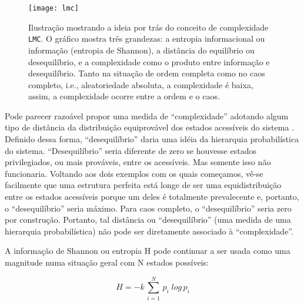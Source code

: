 \documentclass[
	12pt,				%
	openany,oneside,
	a4paper,			%
	english,			%
	brazil,				%
	]{abntex2}
\begin{document}
\begin{figure}
\texttt{[image: lmc]}
\caption{\label{fig2}Ilustração mostrando a ideia por trás do conceito de complexidade \texttt{LMC}. O gráfico mostra três grandezas: a entropia informacional ou informação (entropia de Shannon), a distância do equilíbrio ou desequilíbrio, e a complexidade como o produto entre informação e desequilíbrio. Tanto na situação de ordem completa como no caos completo, i.e., aleatoriedade absoluta, a complexidade é baixa, assim, a complexidade ocorre entre a ordem e o caos.}
\end{figure}


Pode parecer razoável propor uma medida de “complexidade” adotando algum tipo de distância da distribuição equiprovável dos estados acessíveis do sistema \cite{c4}. Definido dessa forma, “desequilíbrio” daria uma idéia da hierarquia probabilística do sistema. “Desequilíbrio” seria diferente de zero se houvesse estados privilegiados, ou mais prováveis, entre os acessíveis. Mas somente isso não funcionaria. Voltando aos dois exemplos com os quais começamos, vê-se facilmente que uma estrutura perfeita está longe de ser uma equidistribuição entre os estados acessíveis porque um deles é totalmente prevalecente e, portanto, o “desequilíbrio” seria máximo. Para caos completo, o “desequilíbrio” seria zero por construção. Portanto, tal distância ou “desequilíbrio” (uma medida de uma hierarquia probabilística) não pode ser diretamente associado à “complexidade”.

A informação de Shannon ou entropia H pode continuar a ser usada como uma magnitude numa situação geral com N estados possíveis:

\begin{equation}
H = -k \, \sum^N_{i=1} \, p_i  \; log \, p_i
\end{equation}
\end{document}
